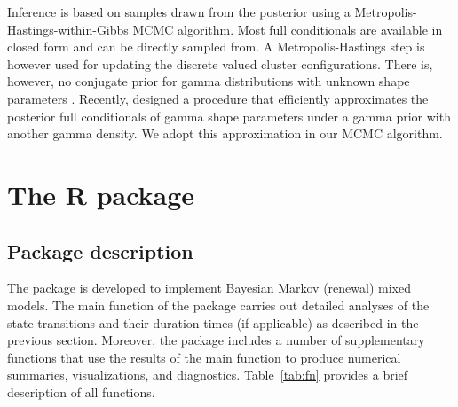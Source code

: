 {Inference is based on samples drawn from the posterior using a Metropolis-Hastings-within-Gibbs MCMC algorithm. 
Most full conditionals are available in closed form and can be directly sampled from. 
A Metropolis-Hastings step is however used for updating the discrete valued cluster configurations. 
There is, however, no conjugate prior for gamma distributions with unknown shape parameters \citep{damsleth1975conjugate}. 
Recently, \citet{miller2019fast} designed a procedure that efficiently approximates the posterior full conditionals of gamma shape parameters under a gamma prior with another gamma density. 
We adopt this approximation in our MCMC algorithm. }

\section{The  R package}\label{sec:func}

\subsection{Package description}

The  package is developed to implement Bayesian Markov (renewal) mixed models. 
The main function  of the package carries out detailed analyses of the state transitions and their {duration times} (if applicable) as described in the previous section.
Moreover,  the package includes a number of supplementary functions that use the results of the main function to produce numerical summaries, visualizations, and diagnostics.  
Table~\ref{tab:fn} provides a brief description of all functions. 






